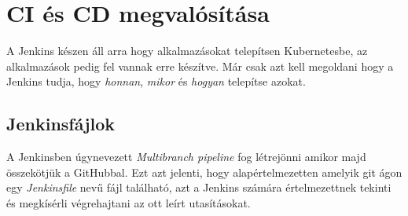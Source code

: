 \section{CI és CD megvalósítása}
A Jenkins készen áll arra hogy alkalmazásokat telepítsen Kubernetesbe, az alkalmazások pedig fel vannak erre készítve. Már csak azt kell megoldani hogy a Jenkins tudja, hogy \textit{honnan}, \textit{mikor} és \textit{hogyan} telepítse azokat.
\subsection{Jenkinsfájlok}
A Jenkinsben úgynevezett \textit{Multibranch pipeline} fog létrejönni amikor majd összekötjük a GitHubbal. Ezt azt jelenti, hogy alapértelmezetten amelyik git ágon egy \textit{Jenkinsfile} nevű fájl található, azt a Jenkins számára értelmezettnek tekinti és megkísérli végrehajtani az ott leírt utasításokat.

